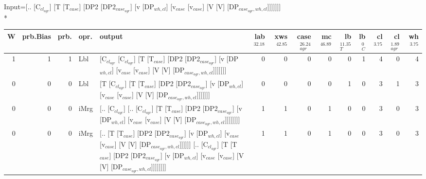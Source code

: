 \begingroup\scriptsize Input=[.. [C$_{cl_{agr}}$] [T [T$_{case}$] [DP2 [DP2$_{case_{agr}}$] [v [DP$_{wh,cl}$] [v$_{case}$ [v$_{case}$] [V [V] [DP$_{case_{agr},wh,cl}$]]]]]]]\\*
\begin{tabularx}{\linewidth}{rrrlXrrrrrrrrr}
\hline
   W &   prb.Bias &   prb. & opr.   & output                                                                                                                                                                                                             &   lab$^{32.18}$ &   xws$^{42.85}$ &   case$_{agr}^{26.24}$ &   mc$^{46.89}$ &   lb$_{T}^{11.35}$ &   lb$_{C}^{0}$ &   cl$^{3.75}$ &   cl$_{agr}^{1.89}$ &   wh$^{3.75}$ \\
\hline
   1 &       1 &   1 & Lbl  & [C$_{cl_{agr}}$ [C$_{cl_{agr}}$] [T [T$_{case}$] [DP2 [DP2$_{case_{agr}}$] [v [DP$_{wh,cl}$] [v$_{case}$ [v$_{case}$] [V [V] [DP$_{case_{agr},wh,cl}$]]]]]]]                                                                                               &             0 &             0 &                  0 &            0 &              0 &             1 &        4 &             0 &        4 \\
   0 &       0 &   0 & Lbl  & [T [C$_{cl_{agr}}$] [T [T$_{case}$] [DP2 [DP2$_{case_{agr}}$] [v [DP$_{wh,cl}$] [v$_{case}$ [v$_{case}$] [V [V] [DP$_{case_{agr},wh,cl}$]]]]]]]                                                                                                      &             0 &             0 &                  0 &            0 &              1 &             0 &        3 &             1 &        3 \\
   0 &       0 &   0 & iMrg & [.. [C$_{cl_{agr}}$] [.. [C$_{cl_{agr}}$] [T [T$_{case}$] [DP2 [DP2$_{case_{agr}}$] [v [DP$_{wh,cl}$] [v$_{case}$ [v$_{case}$] [V [V] [DP$_{case_{agr},wh,cl}$]]]]]]]]                                                                                     &             1 &             1 &                  0 &            1 &              0 &             0 &        3 &             0 &        3 \\
   0 &       0 &   0 & iMrg & [.. [T [T$_{case}$] [DP2 [DP2$_{case_{agr}}$] [v [DP$_{wh,cl}$] [v$_{case}$ [v$_{case}$] [V [V] [DP$_{case_{agr},wh,cl}$]]]]]] [.. [C$_{cl_{agr}}$] [T [T$_{case}$] [DP2 [DP2$_{case_{agr}}$] [v [DP$_{wh,cl}$] [v$_{case}$ [v$_{case}$] [V [V] [DP$_{case_{agr},wh,cl}$]]]]]]]] &             1 &             1 &                  0 &            1 &              0 &             0 &        3 &             0 &        3 \\

\end{tabularx}
